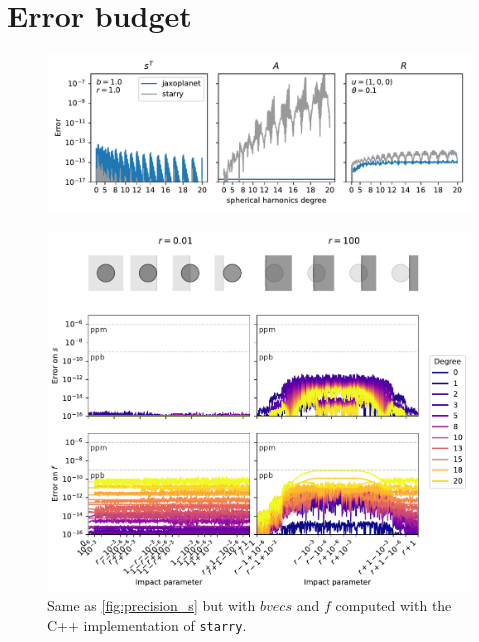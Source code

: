 \documentclass[modern]{aastex631}
\begin{document}
\appendix

\section{Error budget}
\begin{figure}[H]
    \begin{center}
        \includegraphics[width=\textwidth]{../workflows/precision/figures/error_SAR.pdf}
        \caption{}
        \label{fig:precision_SAR}
    \end{center}
\end{figure}

\begin{figure}[H]
    \begin{center}
        \includegraphics[width=\textwidth]{../workflows/precision/figures/error_starry.pdf}
        \caption{Same as \autoref{fig:precision_s} but with $bvec{s}$ and $f$ computed with the C++ implementation of \texttt{starry}. }
        \label{fig:precision_s_starry}
    \end{center}
\end{figure}


\end{document}
